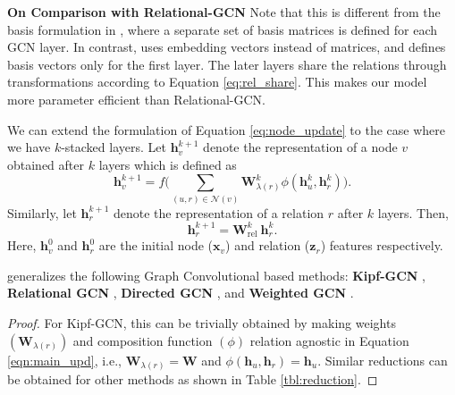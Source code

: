 \documentclass{article} \usepackage{iclr2020_conference,times}
\begin{document}
\textbf{On Comparison with Relational-GCN} Note that this is different from the basis formulation in \cite{r_gcn}, where a separate set of basis matrices is defined for each GCN layer. In contrast, \method{} uses embedding vectors instead of matrices, and defines basis vectors only for the first layer. The later layers share the relations through transformations according to Equation \ref{eq:rel_share}. This makes our model more parameter efficient than Relational-GCN.



We can extend the formulation of Equation \ref{eq:node_update} to the case where we have $k$-stacked \method{} layers. Let $\bm{h}_v^{k+1}$ denote the representation of a node $v$ obtained after $k$ layers which is defined as
\begin{equation}
\label{eqn:main_upd}
\bm{h}_{v}^{k+1} = f \Bigg(\sum_{ (u,r) \in \mathcal{N}(v)} \bm{W}_{\lambda(r)}^k \phi(\bm{h}_{u}^k, \bm{h}_r^k) \Bigg) .
\end{equation}
Similarly, let $\bm{h}_r^{k+1}$ denote the representation of a relation $r$ after $k$ layers. Then,
\[
\bm{h}_r^{k+1} = \bm{W}_{\mathrm{rel}}^k \  \bm{h}_r^k.
\]
Here, $\bm{h}_v^0$ and $\bm{h}_r^0$ are the initial node ($\bm{x}_v$) and relation ($\bm{z}_r$) features respectively. \\ 



\begin{proposition}
\label{prop:reduction}
\method{} generalizes the following Graph Convolutional based methods: \textbf{Kipf-GCN} \citep{Kipf2016}, \textbf{Relational GCN} \citep{r_gcn}, \textbf{Directed GCN} \citep{gcn_srl}, and \textbf{Weighted GCN} \citep{sacn_paper}. 
\end{proposition}
\begin{proof}
	For Kipf-GCN, this can be trivially obtained by making weights $(\bm{W}_{\lambda(r)})$ and composition function $(\phi)$ relation agnostic in Equation \ref{eqn:main_upd}, i.e., $\bm{W}_{\lambda(r)} = \bm{W}$ and $\phi(\bm{h}_{u}, \bm{h}_r) = \bm{h}_u$. Similar reductions can be obtained for other methods as shown in Table \ref{tbl:reduction}.
\end{proof}
\end{document}
